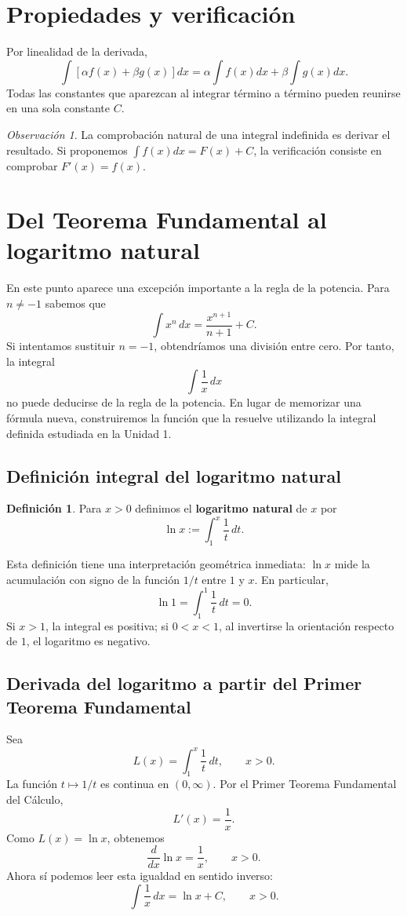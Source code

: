 \documentclass[12pt]{article}
\theoremstyle{definition}\newtheorem{definicion}[teorema]{Definición}\newtheorem{ejemplo}[teorema]{Ejemplo}\newtheorem{ejercicio}[teorema]{Ejercicio}
\theoremstyle{remark}\newtheorem*{observacion}{Observación}\newtheorem*{advertencia}{Advertencia}\newtheorem*{estrategia}{Estrategia}
\begin{document}
\section{Propiedades y verificación}
Por linealidad de la derivada,
\[\int[\alpha f(x)+\beta g(x)]dx=\alpha\int f(x)dx+\beta\int g(x)dx.\]
Todas las constantes que aparezcan al integrar término a término pueden reunirse en una sola constante $C$.
\begin{observacion}La comprobación natural de una integral indefinida es derivar el resultado. Si proponemos $\int f(x)dx=F(x)+C$, la verificación consiste en comprobar $F'(x)=f(x)$.\end{observacion}

\section{Del Teorema Fundamental al logaritmo natural}
En este punto aparece una excepción importante a la regla de la potencia. Para $n\neq-1$ sabemos que
\[
\int x^n\,dx=\frac{x^{n+1}}{n+1}+C.
\]
Si intentamos sustituir $n=-1$, obtendríamos una división entre cero. Por tanto, la integral
\[
\int\frac{1}{x}\,dx
\]
no puede deducirse de la regla de la potencia. En lugar de memorizar una fórmula nueva, construiremos la función que la resuelve utilizando la integral definida estudiada en la Unidad 1.

\subsection{Definición integral del logaritmo natural}
\begin{definicion}
Para $x>0$ definimos el \textbf{logaritmo natural} de $x$ por
\[
\boxed{\ln x:=\int_1^x\frac{1}{t}\,dt.}
\]
\end{definicion}
Esta definición tiene una interpretación geométrica inmediata: $\ln x$ mide la acumulación con signo de la función $1/t$ entre $1$ y $x$. En particular,
\[
\ln1=\int_1^1\frac{1}{t}\,dt=0.
\]
Si $x>1$, la integral es positiva; si $0<x<1$, al invertirse la orientación respecto de $1$, el logaritmo es negativo.

\subsection{Derivada del logaritmo a partir del Primer Teorema Fundamental}
Sea
\[
L(x)=\int_1^x\frac{1}{t}\,dt,\qquad x>0.
\]
La función $t\mapsto1/t$ es continua en $(0,\infty)$. Por el Primer Teorema Fundamental del Cálculo,
\[
L'(x)=\frac1x.
\]
Como $L(x)=\ln x$, obtenemos
\[
\boxed{\frac{d}{dx}\ln x=\frac1x,\qquad x>0.}
\]
Ahora sí podemos leer esta igualdad en sentido inverso:
\[
\boxed{\int\frac1x\,dx=\ln x+C,\qquad x>0.}
\]
\end{document}
